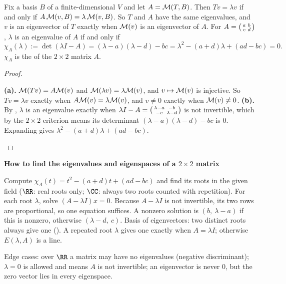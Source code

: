 \documentclass[10pt]{scrartcl}
\newenvironment{methodbox}[1]{\begin{mdframed}[style=methodstyle]\textbf{\color{NavyBlue}#1}\par\vspace{2pt}}{\end{mdframed}}
\begin{document}
\begin{proposition*}
  \begin{enumerate}[(a)]
    \ii Fix a basis $B$ of a finite-dimensional $V$ and let $A=\mathcal M(T,B)$. Then $Tv = \lambda v$ if and only if $A\,\mathcal M(v,B) = \lambda\,\mathcal M(v,B)$. So $T$ and $A$ have the same eigenvalues, and $v$ is an eigenvector of $T$ exactly when $\mathcal M(v)$ is an eigenvector of $A$.
    \ii For $A=\begin{psmallmatrix}a&b\\c&d\end{psmallmatrix}$, $\lambda$ is an eigenvalue of $A$ if and only if
    \[
      \chi_A(\lambda) := \det(\lambda I - A) = (\lambda-a)(\lambda-d) - bc = \lambda^2 - (a+d)\lambda + (ad-bc) = 0.
    \]
    $\chi_A$ is the  of the $2\times2$ matrix $A$.
  \end{enumerate}
\end{proposition*}
\begin{proof}
  \begin{steps}
    \ii \textbf{(a).} $\mathcal M(Tv)=A\mathcal M(v)$  and $\mathcal M(\lambda v)=\lambda\mathcal M(v)$, and $v\mapsto\mathcal M(v)$ is injective. So $Tv=\lambda v$ exactly when $A\mathcal M(v)=\lambda\mathcal M(v)$, and $v\ne0$ exactly when $\mathcal M(v)\ne0$.
    \ii \textbf{(b).} By , $\lambda$ is an eigenvalue exactly when $\lambda I-A=\begin{psmallmatrix}\lambda-a&-b\\-c&\lambda-d\end{psmallmatrix}$ is not invertible, which by the $2\times2$ criterion  means its determinant $(\lambda-a)(\lambda-d)-bc$ is $0$. Expanding gives $\lambda^2-(a+d)\lambda+(ad-bc)$.
  \end{steps}
\end{proof}

\begin{methodbox}{How to find the eigenvalues and eigenspaces of a $2\times2$ matrix}
  \begin{steps}
    \ii Compute $\chi_A(t)=t^2-(a+d)t+(ad-bc)$ and find its roots in the given field ($\RR$: real roots only; $\CC$: always two roots counted with repetition).
    \ii For each root $\lambda$, solve $(A-\lambda I)x=0$. Because $A-\lambda I$ is not invertible, its two rows are proportional, so one equation suffices. A nonzero solution is $(b,\ \lambda-a)$ if this is nonzero, otherwise $(\lambda-d,\ c)$.
    \ii Basis of eigenvectors: two distinct roots always give one (). A repeated root $\lambda$ gives one exactly when $A=\lambda I$; otherwise $E(\lambda,A)$ is a line.
  \end{steps}
  Edge cases: over $\RR$ a matrix may have no eigenvalues (negative discriminant); $\lambda=0$ is allowed and means $A$ is not invertible; an eigenvector is never $0$, but the zero vector lies in every eigenspace.
\end{methodbox}
\end{document}
